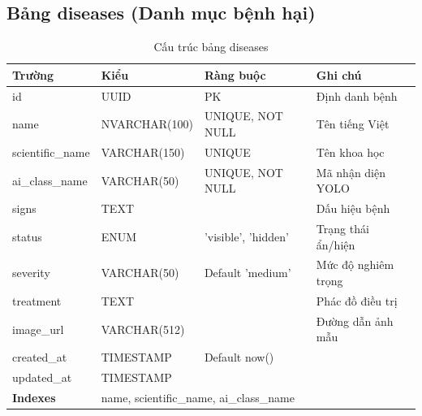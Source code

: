 \documentclass[12pt,a4paper]{article}
\begin{document}
\subsection{Bảng diseases (Danh mục bệnh hại)}
\begin{longtable}{|l|l|l|p{5.5cm}|}
    \caption{Cấu trúc bảng diseases}                                                                                            \\
    \hline
    \rowcolor{headerblue}
    \textbf{Trường}  & \textbf{Kiểu}                                                & \textbf{Ràng buộc}  & \textbf{Ghi chú}    \\
    \hline
    id               & UUID                                                         & PK                  & Định danh bệnh      \\
    \hline
    name             & NVARCHAR(100)                                                & UNIQUE, NOT NULL    & Tên tiếng Việt      \\
    \hline
    scientific\_name & VARCHAR(150)                                                 & UNIQUE              & Tên khoa học        \\
    \hline
    ai\_class\_name  & VARCHAR(50)                                                  & UNIQUE, NOT NULL    & Mã nhận diện YOLO   \\
    \hline
    signs            & TEXT                                                         &                     & Dấu hiệu bệnh       \\
    \hline
    status           & ENUM                                                         & 'visible', 'hidden' & Trạng thái ẩn/hiện  \\
    \hline
    severity         & VARCHAR(50)                                                  & Default 'medium'    & Mức độ nghiêm trọng \\
    \hline
    treatment        & TEXT                                                         &                     & Phác đồ điều trị    \\
    \hline
    image\_url       & VARCHAR(512)                                                 &                     & Đường dẫn ảnh mẫu   \\
    \hline
    created\_at      & TIMESTAMP                                                    & Default now()       &                     \\
    \hline
    updated\_at      & TIMESTAMP                                                    &                     &                     \\
    \hline
    \rowcolor{headerblue}
    \textbf{Indexes} & \multicolumn{3}{l|}{name, scientific\_name, ai\_class\_name}                                             \\
    \hline
\end{longtable}
\end{document}
